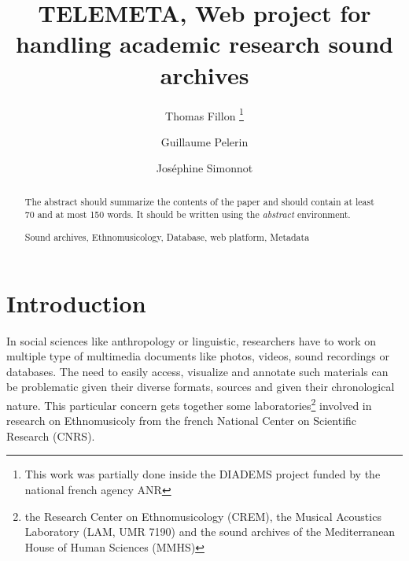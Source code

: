\documentclass[runningheads,a4paper]{llncs}
\newcommand{\keywords}[1]{\par\addvspace\baselineskip
\noindent\keywordname\enspace\ignorespaces#1}
\begin{document}
\mainmatter  %

\title{TELEMETA, Web project for handling academic research sound archives}


%
%
\author{Thomas Fillon
%
\thanks{This work was partially done inside the DIADEMS project funded by the national french agency ANR }%
\and Guillaume Pelerin
 \and Jos{\'e}phine Simonnot
}
%


\maketitle

\setcounter{footnote}{0}


\begin{abstract}
The abstract should summarize the contents of the paper and should
contain at least 70 and at most 150 words. It should be written using the
\emph{abstract} environment.
\keywords{Sound archives, Ethnomusicology, Database, web platform, Metadata}
\end{abstract}


\section{Introduction}

In social sciences like anthropology or linguistic, researchers have to work on multiple type of multimedia documents like photos, videos, sound recordings or databases. The need to easily access, visualize and annotate such materials can be problematic given their diverse formats, sources and given their chronological nature.
This particular concern gets together some laboratories\footnote{the Research Center on Ethnomusicology (CREM), the Musical Acoustics Laboratory (LAM, UMR 7190) and the sound archives of the Mediterranean House of Human Sciences (MMHS)} involved in research on Ethnomusicoly from  the french National Center on Scientific Research (CNRS).
\end{document}
